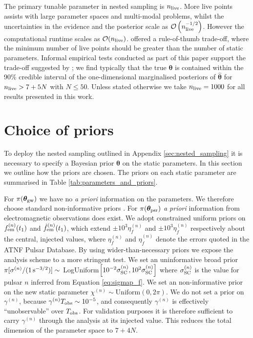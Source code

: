 \documentclass[fleqn,usenatbib,useAMS]{mnras}
\begin{document}
The primary tunable parameter in nested sampling is $n_{\rm live}$. More live points assists with large parameter spaces and multi-modal problems, whilst the uncertainties in the evidence and the posterior scale as $\mathcal{O}\left(n_{\rm live}^{-1/2}\right)$. However the computational runtime scales as $\mathcal{O}(n_{\rm live})$. \cite{Ashton2022} offered a rule-of-thumb trade-off, where the minimum number of live points should be greater than the number of static parameters. Informal empirical tests conducted as part of this paper support the trade-off suggested by \cite{Ashton2022}; we find typically that the true ${\boldsymbol{\theta}}$ is contained within the 90\% credible interval of the one-dimensional marginalised posteriors of ${\boldsymbol{\hat{\theta}}}$ for $n_{\rm live} > 7 + 5N$ with $N \leq 50$. Unless stated otherwise we take $n_{\rm live} = 1000$ for all results presented in this work. \newline 


\section{Choice of priors}\label{sec:set_priors}
To deploy the nested sampling outlined in Appendix \ref{sec:nested_sampling} it is necessary to specify a Bayesian prior $\boldsymbol{\theta}$ on the static parameters. In this section we outline how the priors are chosen. The priors on each static parameter are summarised in Table \ref{tab:parameters_and_priors}.  \newline 

For $\pi(\boldsymbol{\theta}_{\rm gw})$ we have no \textit{a priori} information on the parameters. We therefore choose standard non-informative priors \citep[e.g.][]{Bhagwat2021}. For $\pi(\boldsymbol{\theta}_{\rm psr})$ \textit{a priori} information from electromagnetic observations does exist. We adopt constrained uniform priors on $f_{\rm em}^{(n)}(t_1)$ and $\dot{f}_{\rm em}^{(n)}(t_1)$, which extend $\pm 10^3 \eta_f^{(n)}$ and $\pm 10^3 \eta_{\dot{f}}^{(n)}$ respectively about the central, injected values, where $\eta_f^{(n)}$ and $\eta_{\dot{f}}^{(n)}$ denote the errors quoted in the ATNF Pulsar Database. By using wider-than-necessary priors we expose the analysis scheme to a more stringent test. We set an uninformative broad prior $\pi[\sigma^{(n)} / (1 \, {\rm s^{-3/2}})] \sim$ LogUniform$ \left [10^{-2} \sigma_{\rm SC}^{(n)}, 10^2 \sigma_{\rm SC}^{(n)} \right ]$
where $\sigma_{\rm SC}^{(n)}$ is the value for pulsar $n$ inferred from
Equation \eqref{eq:sigmap_f}. We set an non-informative prior on the new static parameter $\chi^{(n)} \sim \text{Uniform}\left(0,2\pi\right)$. We do not set a prior on $\gamma^{(n)}$, because $\gamma^{(n)} T_{\rm obs} \sim 10^{-5}$, and consequently $\gamma^{(n)}$ is effectively ``unobservable'' over $T_{\rm obs}$. For validation purposes it is therefore sufficient to carry $\gamma^{(n)}$ through the analysis at its injected value. This reduces the total dimension of the parameter space to $7 + 4N$. \newline 
\end{document}

